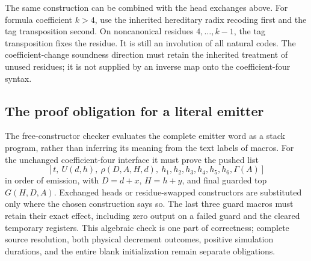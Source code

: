 The same construction can be combined with the head exchanges above.  For
formula coefficient $k>4$, use the inherited hereditary radix recoding first
and the tag transposition second.  On noncanonical residues $4,\ldots,k-1$,
the tag transposition fixes the residue.  It is still an involution of all
natural codes.  The coefficient-change soundness direction must retain the
inherited treatment of unused residues; it is not supplied by an inverse
map onto the coefficient-four syntax.

\subsection{The proof obligation for a literal emitter}

The free-constructor checker evaluates the complete emitter word as a stack
program, rather than inferring its meaning from the text labels of macros.
For the unchanged coefficient-four interface it must prove the pushed list
\[
 [t,\ U(d,h),\ \rho(D,A,H,d),\ h_1,h_2,h_3,h_4,h_5,h_6,\Gamma(A)]
\]
in order of emission, with $D=d+x$, $H=h+y$, and final guarded top
$G(H,D,A)$.  Exchanged heads or residue-swapped constructors are substituted
only where the chosen construction says so.  The last three guard macros
must retain their exact effect, including zero output on a failed guard
and the cleared temporary registers.  This algebraic check is one part of
correctness; complete source resolution, both physical decrement outcomes,
positive simulation durations, and the entire blank initialization remain
separate obligations.
